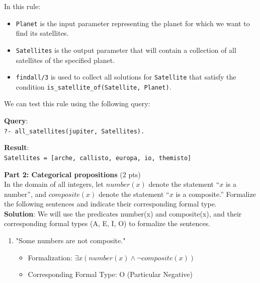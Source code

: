 \documentclass[12pt]{article}
\begin{document}
\begin{spacing}{1.5}
\begin{enumerate}
		      In this rule:
		      \begin{itemize}
		      	\item \texttt{Planet} is the input parameter representing the planet for which we want to           find its satellites.
		      	       
		      	\item \texttt{Satellites} is the output parameter that will contain a collection of all satellites of the specified planet.
		      	       
		      	\item \texttt{findall/3} is used to collect all solutions for \texttt{Satellite} that satisfy the condition \texttt{is\_satellite\_of(Satellite, Planet)}.
		      \end{itemize}
		      		      		      		      		      		      		      		      
		      We can test this rule using the following query:
		      		      		      		      		      		      		      		      
		      \textbf{Query}:\\
		      \texttt{?- all\_satellites(jupiter, Satellites).}
		      		      		      		      		      		      		      		      
		      \textbf{Result}:\\
		      \texttt{Satellites = [arche, callisto, europa, io, themisto]}\\
	\end{enumerate}
								
	\noindent \textbf{Part 2: Categorical propositions} (2 pts)\\
	In the domain of all integers, let $number(x)$ denote the statement “$x$ is a number”, and $composite(x)$ denote the statement “$x$ is a composite.” Formalize the following sentences and indicate their corresponding formal type.\\
							
	\textbf{Solution}: We will use the predicates number(x) and composite(x), and their corresponding formal types (A, E, I, O) to formalize the sentences.
								
	\begin{enumerate}
		\item "Some numbers are not composite."
		      		      		      		      		      		      		      
		      \begin{itemize}
		      	\item Formalization: $\exists x(number(x) \land \neg composite(x))$
		      	\item Corresponding Formal Type: O (Particular Negative)
		      \end{itemize}
		      		      		      		      		      		      		        

\end{enumerate}
\end{spacing}
\end{document}
